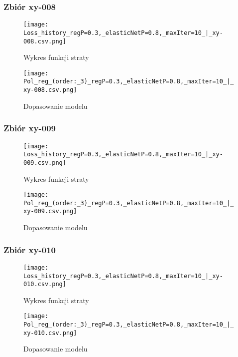 \documentclass{article}
\begin{document}
\subsubsection{Zbiór xy-008}
\begin{figure}[H]
    \centering
    \begin{minipage}{0.45\textwidth}
        \texttt{[image: Loss\_history\_regP=0.3,\_elasticNetP=0.8,\_maxIter=10\_|\_xy-008.csv.png]}
        \caption{Wykres funkcji straty}
    \end{minipage}
    \hfill
    \begin{minipage}{0.45\textwidth}
        \texttt{[image: Pol\_reg\_(order:\_3)\_regP=0.3,\_elasticNetP=0.8,\_maxIter=10\_|\_xy-008.csv.png]}
        \caption{Dopasowanie modelu}
    \end{minipage}
\end{figure}

\subsubsection{Zbiór xy-009}
\begin{figure}[H]
    \centering
    \begin{minipage}{0.45\textwidth}
        \texttt{[image: Loss\_history\_regP=0.3,\_elasticNetP=0.8,\_maxIter=10\_|\_xy-009.csv.png]}
        \caption{Wykres funkcji straty}
    \end{minipage}
    \hfill
    \begin{minipage}{0.45\textwidth}
        \texttt{[image: Pol\_reg\_(order:\_3)\_regP=0.3,\_elasticNetP=0.8,\_maxIter=10\_|\_xy-009.csv.png]}
        \caption{Dopasowanie modelu}
    \end{minipage}
\end{figure}

\subsubsection{Zbiór xy-010}
\begin{figure}[H]
    \centering
    \begin{minipage}{0.45\textwidth}
        \texttt{[image: Loss\_history\_regP=0.3,\_elasticNetP=0.8,\_maxIter=10\_|\_xy-010.csv.png]}
        \caption{Wykres funkcji straty}
    \end{minipage}
    \hfill
    \begin{minipage}{0.45\textwidth}
        \texttt{[image: Pol\_reg\_(order:\_3)\_regP=0.3,\_elasticNetP=0.8,\_maxIter=10\_|\_xy-010.csv.png]}
        \caption{Dopasowanie modelu}
    \end{minipage}
\end{figure}
\end{document}
